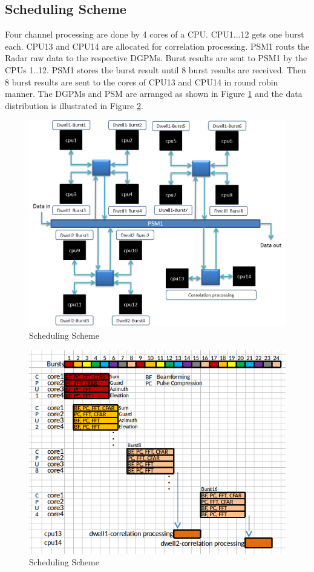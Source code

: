 \subsection{Scheduling Scheme}
\label{ss:mm:scheme5:data_distribution}
Four channel processing are done by 4 cores of a CPU. CPU1...12 gets one burst each. CPU13 and CPU14 are allocated for correlation processing. 
PSM1 routs the Radar raw data to the respective DGPMs. Burst results are sent to PSM1 by the CPUs 1..12. PSM1 stores the burst result until 8 burst results are received. Then 8 burst results are sent to the cores of CPU13 and CPU14 in round robin manner. The DGPMs and PSM are arranged as shown in Figure \ref{fig:mm:scheme5_mode_mapping} and the data distribution is illustrated in Figure \ref{fig:mm:scheme5_data_distri}.

\begin{figure}[h!]
	\centering
	\includegraphics[width=130mm]{figures/scheme5_mode_mapping}
	\caption{Scheduling Scheme}
	\label{fig:mm:scheme5_mode_mapping}
\end{figure}

\begin{figure}[h!]
	\centering
	\includegraphics[width=130mm]{figures/scheme5_data_distri}
	\caption{Scheduling Scheme}
	\label{fig:mm:scheme5_data_distri}
\end{figure}

